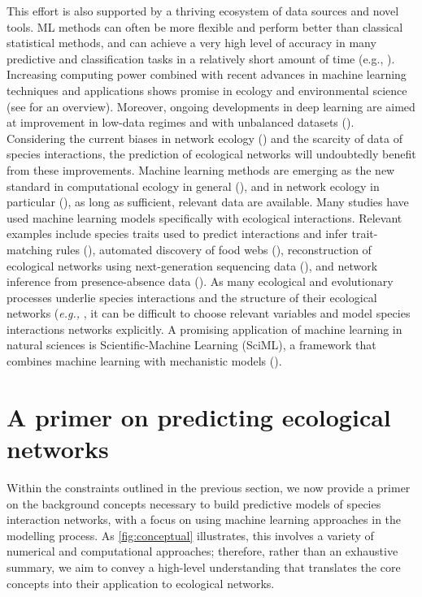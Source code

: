 \begin{refsection}
This effort is also supported by a thriving ecosystem of data sources
and novel tools. ML methods can often be more flexible and perform
better than classical statistical methods, and can achieve a very high
level of accuracy in many predictive and classification tasks in a
relatively short amount of time (e.g., \cite{Cutler2007RanFor,
Krizhevsky2017ImaCla}). Increasing computing power combined with
recent advances in machine learning techniques and applications shows
promise in ecology and environmental science (see \cite{Christin2019AppDee}
for an overview). Moreover, ongoing developments in deep learning are
aimed at improvement in low-data regimes and with unbalanced datasets
(\cite{Antoniou2018DatAug, Chawla2010DatMin}). Considering the current
biases in network ecology (\cite{Poisot2021GloKno}) and the scarcity of
data of species interactions, the prediction of ecological networks will
undoubtedly benefit from these improvements. Machine learning methods
are emerging as the new standard in computational ecology in general
(\cite{Olden2008MacLea, Christin2019AppDee}), and in network ecology in
particular (\cite{Bohan2017NexGlo}), as long as sufficient, relevant data
are available. Many studies have used machine learning models
specifically with ecological interactions. Relevant examples include
species traits used to predict interactions and infer trait-matching
rules (\cite{Desjardins-Proulx2017EcoInt, Pichler2020Machine}), automated
discovery of food webs (\cite{Bohan2011AutDis}), reconstruction of
ecological networks using next-generation sequencing data
(\cite{Bohan2017NexGlo}), and network inference from presence-absence data
(\cite{Sander2017EcoNet}). As many ecological and evolutionary processes
underlie species interactions and the structure of their ecological
networks (\emph{e.g.,} \cite{Vazquez2009UniPat, Segar2020RolEvo}, it can be
difficult to choose relevant variables and model species interactions
networks explicitly. A promising application of machine learning in
natural sciences is Scientific-Machine Learning (SciML), a framework
that combines machine learning with mechanistic models
(\cite{Chuang2018AdvCon, Rackauckas2020UniDif}).

\section{A primer on predicting ecological
networks}\label{a-primer-on-predicting-ecological-networks}

Within the constraints outlined in the previous section, we now provide
a primer on the background concepts necessary to build predictive models
of species interaction networks, with a focus on using machine learning
approaches in the modelling process. As \autoref{fig:conceptual} illustrates,
this involves a variety of numerical and computational approaches;
therefore, rather than an exhaustive summary, we aim to convey a
high-level understanding that translates the core concepts into their
application to ecological networks.


\end{refsection}
